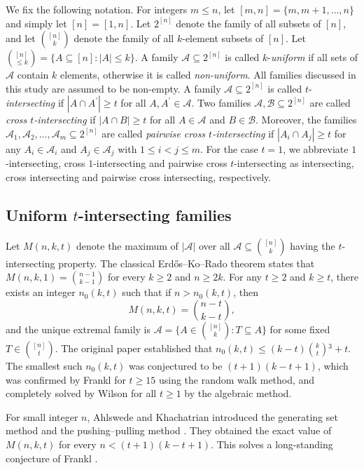 \documentclass[11pt,a4paper]{article}
\begin{document}
We fix the following notation. 
For integers $m\leq n$, let  $[m,n]=\{m, m+1, \ldots, n\}$ and simply let $[n]=[1,n]$. Let $2^{[n]}$ denote the family of all subsets of $[n]$, and let  $\binom{[n]}{k}$ denote the family of all $k$-element subsets of $[n]$.  Let $\binom{[n]}{\leq k}=\{A\subseteq [n]: |A|\leq k\}$. A family $\mathcal{A}\subseteq 2^{[n]}$  is called $k$-\textit{uniform} if all sets of $\mathcal{A}$ contain $k$ elements, otherwise it is called \textit{non-uniform}. 
All families discussed in this study are assumed to be non-empty. 
 A family $\mathcal{A} \subseteq 2^{[n]}$ is called $t$-\textit{intersecting} if $|A\cap A^{\prime}|\geq  t$
 for all $A, A^{\prime}\in \mathcal{A}$. 
Two families $ \mathcal{A}, \mathcal{B} \subseteq 2^{[n]} $ are called  \textit{cross $t$-intersecting} if $|A\cap B|\geq  t$
 for all $A\in \mathcal{A}$ and $B\in \mathcal{B}$.
Moreover, the families $ \mathcal{A}_1, \mathcal{A}_2, \ldots, \mathcal{A}_m \subseteq 2^{[n]}$  are called  \textit{pairwise cross $t$-intersecting} if $|A_i\cap A_j|\geq  t$ for any $A_i\in \mathcal{A}_i$ and $A_j\in \mathcal{A}_j$ with $1\leq i<j\leq m$. 
For the case $t=1$, we abbreviate $1$-intersecting, cross $1$-intersecting and pairwise cross $t$-intersecting as intersecting, cross intersecting and pairwise cross intersecting, respectively.

\subsection{Uniform $t$-intersecting families} 


Let $M(n, k, t)$ denote the maximum of $|\mathcal{A}|$ over all $\mathcal{A}\subseteq \binom{[n]}{k}$ having the $t$-intersecting property.
The classical Erd\H{o}s--Ko--Rado theorem \cite{E61} states that $M(n,k,1)={n-1 \choose k-1}$ for every $k\geq 2$ and $n\geq 2k$. 
For any $t\geq 2$ and $k\geq t$, there exists an integer $n_0(k,t)$ such that if $n>n_0(k, t)$, then 
\[ M(n, k, t)=\binom{n-t}{k-t}, \] 
and the unique extremal family is $\mathcal{A}=\{A\in {[n] \choose k}: T\subseteq A\}$ for some fixed $T\in {[n ] \choose t}$.  The original paper \cite{E61} established that $n_0(k,t) \leq (k-t) {k \choose t} {}^3 +t$. 
The smallest such $n_0(k,t)$ was conjectured to be $(t+1)(k-t+1)$, which was confirmed by Frankl \cite{F78} for $t\geq  15$ using the random walk method, and completely solved by Wilson \cite{W84} for all $t\geq 1$ by the algebraic method. 

For small integer $n$, Ahlswede and Khachatrian introduced the generating set method \cite{AK1997} and the pushing--pulling method \cite{AK1999}. 
They obtained the exact value of $M(n, k, t)$ for every $n < (t+1)(k-t+1)$. This solves a long-standing conjecture of Frankl \cite{F78}. 
\end{document}

